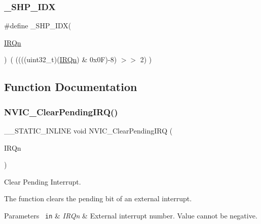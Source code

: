\mbox{\label{group___c_m_s_i_s___core___n_v_i_c_functions_gaee4f7eb5d7e770ad51489dbceabb1755}} 
\subsubsection{\texorpdfstring{\_SHP\_IDX}{\_SHP\_IDX}}
{\footnotesize\ttfamily \#define \+\_\+\+S\+H\+P\+\_\+\+I\+DX(\begin{DoxyParamCaption}\item[{}]{\mbox{\hyperlink{group___s_a_m_d21_e15_a__cmsis_ga666eb0caeb12ec0e281415592ae89083}{I\+R\+Qn}} }\end{DoxyParamCaption})~( ((((uint32\+\_\+t)(\mbox{\hyperlink{group___s_a_m_d21_e15_a__cmsis_ga666eb0caeb12ec0e281415592ae89083}{I\+R\+Qn}}) \& 0x0\+F)-\/8) $>$$>$    2)     )}



\subsection{Function Documentation}
\mbox{\label{group___c_m_s_i_s___core___n_v_i_c_functions_ga332e10ef9605dc6eb10b9e14511930f8}} 
\subsubsection{\texorpdfstring{NVIC\_ClearPendingIRQ()}{NVIC\_ClearPendingIRQ()}}
{\footnotesize\ttfamily \+\_\+\+\_\+\+S\+T\+A\+T\+I\+C\+\_\+\+I\+N\+L\+I\+NE void N\+V\+I\+C\+\_\+\+Clear\+Pending\+I\+RQ (\begin{DoxyParamCaption}\item[{\mbox{\hyperlink{group___s_a_m_d21_e15_a__cmsis_gac3af4a32370fb28c4ade8bf2add80251}{I\+R\+Qn\+\_\+\+Type}}}]{I\+R\+Qn }\end{DoxyParamCaption})}



Clear Pending Interrupt. 

The function clears the pending bit of an external interrupt.


\begin{DoxyParams}[1]{Parameters}
\mbox{\texttt{ in}}  & {\em I\+R\+Qn} & External interrupt number. Value cannot be negative. \\
\hline
\end{DoxyParams}
\mbox{\label{group___c_m_s_i_s___core___n_v_i_c_functions_ga260fba04ac8346855c57f091d4ee1e71}} 
